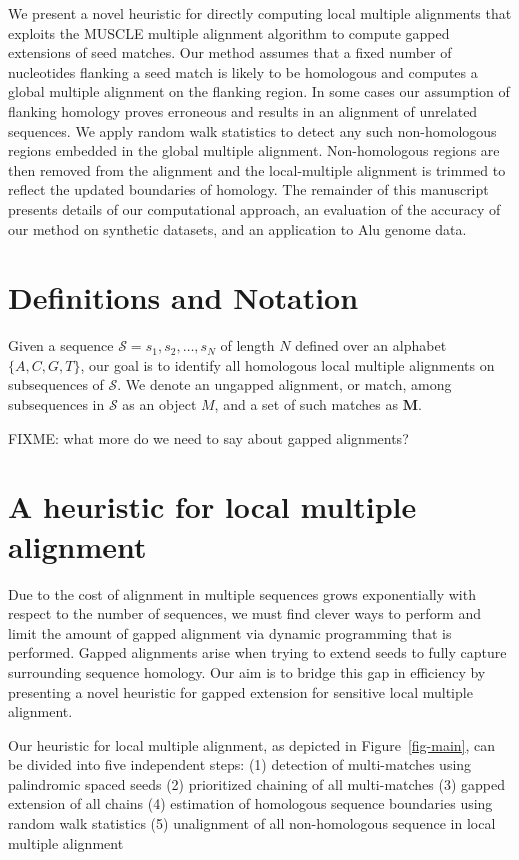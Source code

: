 \documentclass[twoside,11pt]{article}
\begin{document}
We present a novel heuristic for directly computing local multiple alignments that exploits the MUSCLE multiple alignment algorithm to compute gapped extensions of seed matches.  Our method assumes that a fixed number of nucleotides flanking a seed match is likely to be homologous and computes a global multiple alignment on the flanking region.  In some cases our assumption of flanking homology proves erroneous and results in an alignment of unrelated sequences.  We apply random walk statistics to detect any such non-homologous regions embedded in the global multiple alignment.  Non-homologous regions are then removed from the alignment and the local-multiple alignment is trimmed to reflect the updated boundaries of homology.  The remainder of this manuscript presents details of our computational approach, an evaluation of the accuracy of our method on synthetic datasets, and an application to Alu genome data.



\label{sec:overview}
\section{Definitions and Notation}

Given a sequence $\mathcal{S}=s_1, s_2,\dots, s_N$ of length $N$
defined over an alphabet $\{A,C,G,T\}$, our goal is to identify all homologous
local multiple alignments on subsequences of $\mathcal{S}$. We denote
an ungapped alignment, or match, among subsequences in $\mathcal{S}$
as an object $M$, and a set of such matches as $\mathbf{M}$. 

FIXME: what more do we need to say about gapped alignments?

\section{A heuristic for local multiple alignment}
Due to the cost of alignment in multiple sequences grows exponentially with respect to the number of sequences, we must find clever ways to perform and limit the amount of gapped alignment via dynamic programming that is performed. Gapped alignments arise when trying to extend seeds to fully capture surrounding sequence homology. Our aim is to bridge this gap in efficiency by presenting a novel heuristic for gapped extension for sensitive local multiple alignment.

Our heuristic for local multiple alignment, as depicted in Figure~\ref{fig-main},
can be divided into five independent steps:
(1) detection of multi-matches using palindromic spaced seeds
(2) prioritized chaining of all multi-matches
(3) gapped extension of all chains
(4) estimation of homologous sequence boundaries using random walk statistics
(5) unalignment of all non-homologous sequence in local multiple alignment
\end{document}
